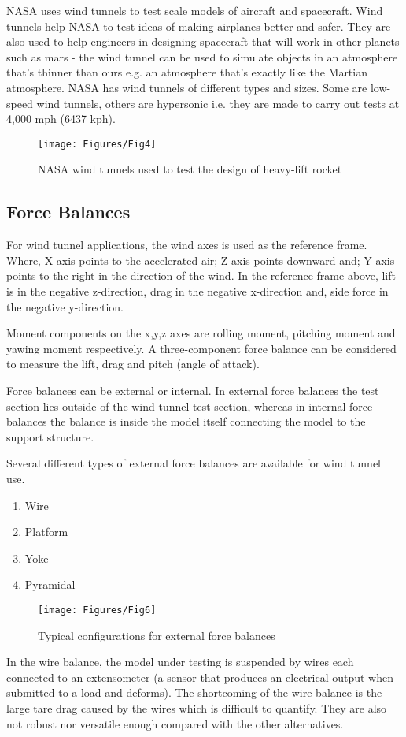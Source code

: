 NASA uses wind tunnels to test scale models of aircraft and spacecraft. Wind tunnels help NASA to test ideas of making airplanes better and safer. They are also used to help engineers in designing spacecraft that will work in other planets such as mars - the wind tunnel can be used to simulate objects in an atmosphere that's thinner than ours e.g. an atmosphere that's exactly like the Martian atmosphere. NASA has wind tunnels of different types and sizes. Some are low-speed wind tunnels, others are hypersonic i.e. they are made to carry out tests at 4,000 mph (6437 kph).
\begin{center}
    \begin{figure}[!h]
\centering
\texttt{[image: Figures/Fig4]}
\caption{NASA wind tunnels used to test the design of heavy-lift rocket}
\end{figure}
\end{center}
\subsection{Force Balances}
For wind tunnel applications, the wind axes is used as the reference frame. Where, X axis points to the accelerated air; Z axis points downward and; Y axis points to the right in the direction of the wind. In the reference frame above, lift is in the negative z-direction, drag in the negative x-direction and, side force in the negative y-direction.

Moment components on the x,y,z axes are rolling moment, pitching moment and yawing moment respectively. A three-component force balance can be considered to measure the lift, drag and pitch (angle of attack).

Force balances can be external or internal. In external force balances the test section lies outside of the wind tunnel test section, whereas in internal force balances the balance is inside the model itself connecting the model to the support structure.

Several different types of external force balances are available for wind tunnel use.
\begin{enumerate}
\item Wire
\item Platform
\item Yoke
\item Pyramidal
\end{enumerate}
\begin{center}
	\begin{figure}[!h]
	\centering
	\texttt{[image: Figures/Fig6]}
	\caption{Typical configurations for external force balances}
	\end{figure}
\end{center}
In the wire balance, the model under testing is suspended by wires each connected to an extensometer (a sensor that produces an electrical output when submitted to a load and deforms). The shortcoming of the wire balance is the large tare drag caused by the wires which is difficult to quantify. They are also not robust nor versatile enough compared with the other alternatives. 


